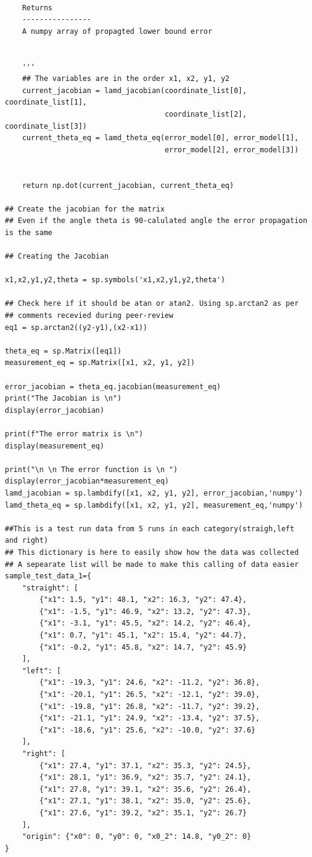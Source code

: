 {\begin{itemize}
\begin{verbatim}
    
    Returns
    ----------------
    A numpy array of propagted lower bound error
    
    
    '''
    ## The variables are in the order x1, x2, y1, y2
    current_jacobian = lamd_jacobian(coordinate_list[0], coordinate_list[1],
                                     coordinate_list[2], coordinate_list[3])
    current_theta_eq = lamd_theta_eq(error_model[0], error_model[1],
                                     error_model[2], error_model[3])
   

    return np.dot(current_jacobian, current_theta_eq)
    
## Create the jacobian for the matrix
## Even if the angle theta is 90-calulated angle the error propagation is the same 

## Creating the Jacobian

x1,x2,y1,y2,theta = sp.symbols('x1,x2,y1,y2,theta')

## Check here if it should be atan or atan2. Using sp.arctan2 as per
## comments recevied during peer-review
eq1 = sp.arctan2((y2-y1),(x2-x1))

theta_eq = sp.Matrix([eq1])
measurement_eq = sp.Matrix([x1, x2, y1, y2])

error_jacobian = theta_eq.jacobian(measurement_eq)
print("The Jacobian is \n")
display(error_jacobian)

print(f"The error matrix is \n")
display(measurement_eq)

print("\n \n The error function is \n ")
display(error_jacobian*measurement_eq)
lamd_jacobian = sp.lambdify([x1, x2, y1, y2], error_jacobian,'numpy')
lamd_theta_eq = sp.lambdify([x1, x2, y1, y2], measurement_eq,'numpy')

##This is a test run data from 5 runs in each category(straigh,left and right)
## This dictionary is here to easily show how the data was collected 
## A sepearate list will be made to make this calling of data easier
sample_test_data_1={
    "straight": [
        {"x1": 1.5, "y1": 48.1, "x2": 16.3, "y2": 47.4},
        {"x1": -1.5, "y1": 46.9, "x2": 13.2, "y2": 47.3},
        {"x1": -3.1, "y1": 45.5, "x2": 14.2, "y2": 46.4},
        {"x1": 0.7, "y1": 45.1, "x2": 15.4, "y2": 44.7},
        {"x1": -0.2, "y1": 45.8, "x2": 14.7, "y2": 45.9}
    ],
    "left": [
        {"x1": -19.3, "y1": 24.6, "x2": -11.2, "y2": 36.8},
        {"x1": -20.1, "y1": 26.5, "x2": -12.1, "y2": 39.0},
        {"x1": -19.8, "y1": 26.8, "x2": -11.7, "y2": 39.2},
        {"x1": -21.1, "y1": 24.9, "x2": -13.4, "y2": 37.5},
        {"x1": -18.6, "y1": 25.6, "x2": -10.0, "y2": 37.6}
    ],
    "right": [
        {"x1": 27.4, "y1": 37.1, "x2": 35.3, "y2": 24.5},
        {"x1": 28.1, "y1": 36.9, "x2": 35.7, "y2": 24.1},
        {"x1": 27.8, "y1": 39.1, "x2": 35.6, "y2": 26.4},
        {"x1": 27.1, "y1": 38.1, "x2": 35.0, "y2": 25.6},
        {"x1": 27.6, "y1": 39.2, "x2": 35.1, "y2": 26.7}
    ],
    "origin": {"x0": 0, "y0": 0, "x0_2": 14.8, "y0_2": 0}
}


\end{verbatim}
\end{itemize}}
